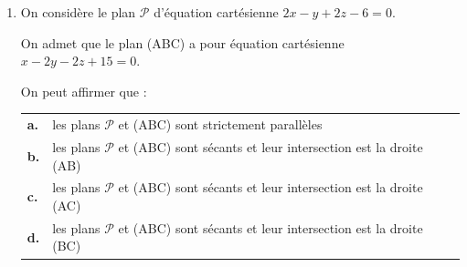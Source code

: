 \documentclass[10pt]{article}
\begin{document}
\begin{enumerate}
\item On considère le plan $\mathcal{P}$ d'équation cartésienne $2x - y + 2z - 6 = 0$.

On admet que le plan (ABC) a pour équation cartésienne $x-2 y-2 z+15=0$.

On peut affirmer que :

\begin{tabularx}{\linewidth}
{@{}>{\bfseries}p{5mm}@{}X }
a.& les plans $\mathcal{P}$ et (ABC) sont strictement parallèles\\
b.& les plans $\mathcal{P}$ et (ABC) sont sécants et leur intersection est la droite (AB)\\
c.& les plans $\mathcal{P}$ et (ABC) sont sécants et leur intersection est la droite (AC)\\
d.& les plans $\mathcal{P}$ et (ABC) sont sécants et leur intersection est la droite (BC)\\
\end{tabularx}
\end{enumerate}

\bigskip
\end{document}
